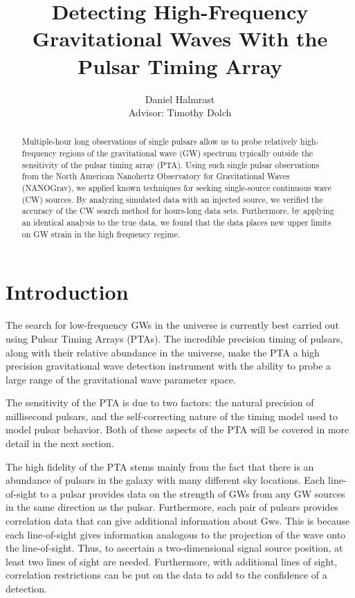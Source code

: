 \documentclass[12pt]{article}
\begin{document}
\bigskip

\title{Detecting High-Frequency Gravitational Waves With the Pulsar Timing Array}
\author{Daniel Halmrast \\ Advisor: Timothy Dolch}

\maketitle

\begin{abstract}
Multiple-hour long observations of single pulsars allow us to probe relatively
high-frequency regions of the gravitational wave (GW) spectrum typically outside
the sensitivity of the pulsar timing array (PTA). Using such single pulsar
observations from the North American Nanohertz Observatory for Gravitational
Waves (NANOGrav), we applied known techniques for seeking single-source continuous
wave (CW) sources. By analyzing simulated data with an injected source, we
verified the accuracy of the CW search method for hours-long data sets.
Furthermore, by applying an identical analysis to the true data, we found that
the data places new upper limits on GW strain in the high frequency regime.
\end{abstract}

\section{Introduction}
The search for low-frequency GWs in the universe is currently
best carried out using Pulsar Timing Arrays (PTAs). The incredible precision timing of
pulsars, along with their relative abundance in the universe, make the PTA a
high precision gravitational wave detection instrument with the ability to probe
a large range of the gravitational wave parameter space.

The sensitivity of the PTA is due to two factors: the natural precision of
millisecond pulsars, and the self-correcting nature of the timing model used to
model pulsar behavior. Both of these aspects of the PTA will be covered in more
detail in the next section.

The high fidelity of the PTA stems mainly from the fact that there is an
abundance of pulsars in the galaxy with many different sky locations.
Each line-of-sight to a pulsar provides data on the strength of
GWs from any GW sources in the same direction as the pulsar. Furthermore, each pair of
pulsars provides correlation data that can give additional information about Gws.
This is because each line-of-sight
gives information analogous to the projection of the wave onto the line-of-sight. Thus, to ascertain a two-dimensional signal source position, at least two
lines of sight are needed. Furthermore, with additional lines of sight,
correlation restrictions can be put on the data to add to the confidence of a
detection.
\end{document}
